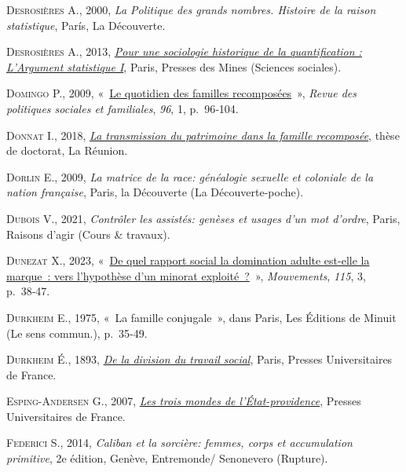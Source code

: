 \documentclass[
  12pt,
]{book}
\newlength{\cslhangindent}
\newenvironment{CSLReferences}[2] %
 {\begin{list}{}{%
  \setlength{\itemindent}{0pt}
  \setlength{\leftmargin}{0pt}
  \setlength{\parsep}{0pt}
  \ifodd #1
   \setlength{\leftmargin}{\cslhangindent}
   \setlength{\itemindent}{-1\cslhangindent}
  \fi
  \setlength{\itemsep}{#2\baselineskip}}}
 {\end{list}}
\begin{document}
\begin{CSLReferences}{0}{1}
\textsc{Desrosières A.}, 2000, \emph{La Politique des grands nombres.
Histoire de la raison statistique}, París, La Découverte.

\textsc{Desrosières A.}, 2013,
\emph{\href{http://books.openedition.org/pressesmines/901}{Pour une
sociologie historique de la quantification : L{'}Argument statistique
I}}, Paris, Presses des Mines (Sciences sociales).

\textsc{Domingo P.}, 2009,
{«~\href{https://doi.org/10.3406/caf.2009.2462}{Le quotidien des
familles recomposées}~»}, \emph{Revue des politiques sociales et
familiales}, \emph{96}, 1, p.~96‑104.

\textsc{Donnat I.}, 2018,
\emph{\href{http://www.theses.fr/2018LARE0021}{La transmission du
patrimoine dans la famille recomposée}}, thèse de doctorat, La Réunion.

\textsc{Dorlin E.}, 2009, \emph{La matrice de la race: généalogie
sexuelle et coloniale de la nation française}, Paris, la Découverte (La
Découverte-poche).

\textsc{Dubois V.}, 2021, \emph{Contrôler les assistés: genèses et
usages d'un mot d'ordre}, Paris, Raisons d'agir (Cours \& travaux).

\textsc{Dunezat X.}, 2023,
{«~\href{https://doi.org/10.3917/mouv.115.0038}{De quel rapport social
la domination adulte est-elle la marque~: vers l{'}hypothèse d{'}un
minorat exploité~?}~»}, \emph{Mouvements}, \emph{115}, 3, p.~38‑47.

\textsc{Durkheim E.}, 1975, {«~La famille conjugale~»}, dans Paris, Les
Éditions de Minuit (Le sens commun.), p.~35‑49.

\textsc{Durkheim É.}, 1893,
\emph{\href{https://www.cairn.info/de-la-division-du-travail-social--9782130619574.htm}{De
la division du travail social}}, Paris, Presses Universitaires de
France.

\textsc{Esping-Andersen G.}, 2007,
\emph{\href{https://www.cairn.info/les-trois-mondes-de-l-etat-providence--9782130559160.htm}{Les
trois mondes de l'État-providence}}, Presses Universitaires de France.

\textsc{Federici S.}, 2014, \emph{Caliban et la sorcière: femmes, corps
et accumulation primitive}, 2e édition, Genève, Entremonde/ Senonevero
(Rupture).


\end{CSLReferences}
\end{document}
